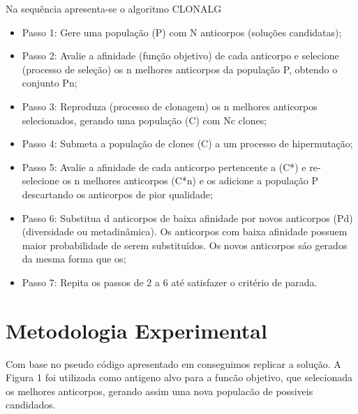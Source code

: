 \documentclass[conference]{IEEEtran}
\begin{document}
    Na sequência apresenta-se o algoritmo CLONALG \cite{SS}
    \begin{itemize}
    
    \item Passo 1: Gere uma população (P) com N anticorpos (soluções candidatas);
    
    \item Passo  2:  Avalie  a  afinidade  (função  objetivo)  de  cada  anticorpo  e  selecione  (processo de seleção) os n melhores anticorpos da população P, obtendo o conjunto Pn; 
    
    \item Passo 3: Reproduza  (processo de clonagem) os  n melhores anticorpos selecionados, gerando uma  população  (C)  com  Nc  clones; 
    \item Passo 4: Submeta a população de clones (C) a um processo de hipermutação; 
    
    \item Passo 5: Avalie a afinidade de cada anticorpo pertencente a (C*) e re-selecione os n melhores anticorpos  (C*{n})  e os  adicione a  população P  descartando  os anticorpos  de pior qualidade; 
    
    \item Passo 6: Substitua d anticorpos de baixa afinidade por novos anticorpos (P{d}) (diversidade ou metadinâmica). Os anticorpos com baixa afinidade possuem maior probabilidade de serem substituídos. Os novos anticorpos sáo gerados da mesma forma que os; 
    \item Passo 7: Repita os passos de 2 a 6 até satisfazer o critério de parada. 
    \end{itemize}
    
\section{Metodologia Experimental}
    

    Com base no pseudo código apresentado em \cite{LNCASTRO2} conseguimos replicar a solução. A Figura 1 foi utilizada como antigeno alvo para a funcão objetivo, que selecionada os melhores anticorpos, gerando assim uma nova populacão de possiveis candidados.
 
\end{document}
